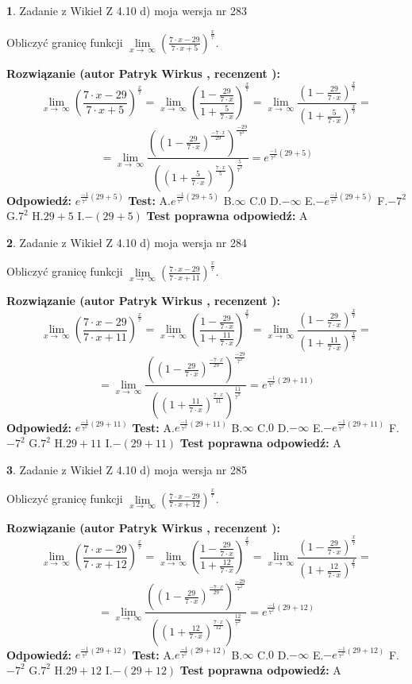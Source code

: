 \documentclass[12pt, a4paper]{article}
\theoremstyle{definition} %
\newtheorem{zad}{}
\newcommand{\zadStart}[1]{\begin{zad}#1\newline}
\newcommand{\zadStop}{\end{zad}}
\newcommand{\rozwStart}[2]{\noindent \textbf{Rozwiązanie (autor #1 , recenzent #2): }\newline}
\newcommand{\rozwStop}{\newline}
\newcommand{\odpStart}{\noindent \textbf{Odpowiedź:}\newline}
\newcommand{\odpStop}{\newline}
\newcommand{\testStart}{\noindent \textbf{Test:}\newline}
\newcommand{\testStop}{\newline}
\newcommand{\kluczStart}{\noindent \textbf{Test poprawna odpowiedź:}\newline}
\newcommand{\kluczStop}{\newline}
\begin{document}
\zadStart{Zadanie z Wikieł Z 4.10 d) moja wersja nr 283}


Obliczyć granicę funkcji  $\lim\limits_{x\to\ \infty}(\frac{7\cdot x-29}{7\cdot x+5})^{\frac{x}{7}}$.
\zadStop
\rozwStart{Patryk Wirkus}{}
$$\lim\limits_{x\to\ \infty}(\frac{7\cdot x-29}{7\cdot x+5})^{\frac{x}{7}} = \lim\limits_{x\to\ \infty}(\frac{1-\frac{29}{7\cdot x}}{1+\frac{5}{7\cdot x}})^{\frac{x}{7}}=\lim\limits_{x\to\ \infty}\frac{(1-\frac{29}{7\cdot x})^{\frac{x}{7}}}{(1+\frac{5}{7\cdot x})^{\frac{x}{7}}}=$$
$$=\lim\limits_{x\to\ \infty}\frac{((1-\frac{29}{7\cdot x})^{\frac{-7\cdot x}{29}})^{\frac{-29}{7^{2}}}}{((1+\frac{5}{7\cdot x})^{\frac{7\cdot x}{5}})^{\frac{5}{7^{2}}}}=e^{\frac{-1}{7^{2}}(29+5)}$$
\rozwStop
\odpStart
$e^{\frac{-1}{7^{2}}(29+5)}$
\odpStop
\testStart
A.$e^{\frac{-1}{7^{2}}(29+5)}$ B.$\infty$ C.$0$ D.$-\infty$ E.$-e^{\frac{-1}{7^{2}}(29+5)}$
F.$-7^{2}$ G.$7^{2}$
H.$29+5$
I.$-(29+5)$
\testStop
\kluczStart
A
\kluczStop



\zadStart{Zadanie z Wikieł Z 4.10 d) moja wersja nr 284}


Obliczyć granicę funkcji  $\lim\limits_{x\to\ \infty}(\frac{7\cdot x-29}{7\cdot x+11})^{\frac{x}{7}}$.
\zadStop
\rozwStart{Patryk Wirkus}{}
$$\lim\limits_{x\to\ \infty}(\frac{7\cdot x-29}{7\cdot x+11})^{\frac{x}{7}} = \lim\limits_{x\to\ \infty}(\frac{1-\frac{29}{7\cdot x}}{1+\frac{11}{7\cdot x}})^{\frac{x}{7}}=\lim\limits_{x\to\ \infty}\frac{(1-\frac{29}{7\cdot x})^{\frac{x}{7}}}{(1+\frac{11}{7\cdot x})^{\frac{x}{7}}}=$$
$$=\lim\limits_{x\to\ \infty}\frac{((1-\frac{29}{7\cdot x})^{\frac{-7\cdot x}{29}})^{\frac{-29}{7^{2}}}}{((1+\frac{11}{7\cdot x})^{\frac{7\cdot x}{11}})^{\frac{11}{7^{2}}}}=e^{\frac{-1}{7^{2}}(29+11)}$$
\rozwStop
\odpStart
$e^{\frac{-1}{7^{2}}(29+11)}$
\odpStop
\testStart
A.$e^{\frac{-1}{7^{2}}(29+11)}$ B.$\infty$ C.$0$ D.$-\infty$ E.$-e^{\frac{-1}{7^{2}}(29+11)}$
F.$-7^{2}$ G.$7^{2}$
H.$29+11$
I.$-(29+11)$
\testStop
\kluczStart
A
\kluczStop



\zadStart{Zadanie z Wikieł Z 4.10 d) moja wersja nr 285}


Obliczyć granicę funkcji  $\lim\limits_{x\to\ \infty}(\frac{7\cdot x-29}{7\cdot x+12})^{\frac{x}{7}}$.
\zadStop
\rozwStart{Patryk Wirkus}{}
$$\lim\limits_{x\to\ \infty}(\frac{7\cdot x-29}{7\cdot x+12})^{\frac{x}{7}} = \lim\limits_{x\to\ \infty}(\frac{1-\frac{29}{7\cdot x}}{1+\frac{12}{7\cdot x}})^{\frac{x}{7}}=\lim\limits_{x\to\ \infty}\frac{(1-\frac{29}{7\cdot x})^{\frac{x}{7}}}{(1+\frac{12}{7\cdot x})^{\frac{x}{7}}}=$$
$$=\lim\limits_{x\to\ \infty}\frac{((1-\frac{29}{7\cdot x})^{\frac{-7\cdot x}{29}})^{\frac{-29}{7^{2}}}}{((1+\frac{12}{7\cdot x})^{\frac{7\cdot x}{12}})^{\frac{12}{7^{2}}}}=e^{\frac{-1}{7^{2}}(29+12)}$$
\rozwStop
\odpStart
$e^{\frac{-1}{7^{2}}(29+12)}$
\odpStop
\testStart
A.$e^{\frac{-1}{7^{2}}(29+12)}$ B.$\infty$ C.$0$ D.$-\infty$ E.$-e^{\frac{-1}{7^{2}}(29+12)}$
F.$-7^{2}$ G.$7^{2}$
H.$29+12$
I.$-(29+12)$
\testStop
\kluczStart
A
\kluczStop
\end{document}
